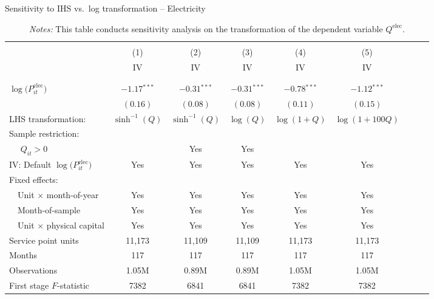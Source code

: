 \begin{table}[t!]\centering
\small
\caption{Sensitivity to IHS vs.\ log transformation -- Electricity  \label{tab:elec_regs_ihs_logs}}
\vspace{-0.1cm}
\small
\begin{adjustbox}{center} 
\begin{tabular}{lcccccccc} 
\hline \hline
\vspace{-0.37cm}
\\
 & (1)  & (2)  & (3)  & (4)  & (5)   \\ 
[0.1em]
 & IV & IV & IV & IV & IV  \\
\vspace{-0.37cm}
\\
\cline{2-6}
\vspace{-0.27cm}
\\
 $\log\big(P^{\text{elec}}_{it}\big)$ ~ & $-1.17$$^{***}$  & $-0.31$$^{***}$ & $-0.31$$^{***}$ & $-0.78$$^{***}$ & $-1.12$$^{***}$ \\ 
& $(0.16)$ & $(0.08)$ & $(0.08)$ & $(0.11)$ & $(0.15)$  \\
[1.5em] 
LHS transformation: & $ \sinh^{-1}(Q) $ & $ \sinh^{-1}(Q) $ & $\log(Q)$  & $\log(1+Q)$   &  $\log(1+100Q)$  \\
[1.5em] 
Sample restriction: \\
~~ $Q_{it} > 0$ &  &Yes &Yes  &   &    \\
[1em] 
IV: Default $\log\big(P^{\text{elec}}_{it}\big)$  & Yes & Yes & Yes  & Yes  &  Yes \\
[1em] 
Fixed effects: \\
[0.1em] 
~~Unit $\times$ month-of-year  & Yes  & Yes  & Yes  & Yes  & Yes   \\ 
[0.1em] 
~~Month-of-sample  & Yes  & Yes  & Yes  & Yes  & Yes     \\ 
[0.1em] 
~~Unit $\times$ physical capital & Yes & Yes & Yes & Yes & Yes  \\
[1em] 
Service point units & 11,173 & 11,109 & 11,109 & 11,173 & 11,173   \\ 
[0.1em] 
Months  & 117 & 117 & 117 & 117 & 117  \\ 
[0.1em] 
Observations & 1.05M & 0.89M & 0.89M & 1.05M & 1.05M  \\ 
[0.1em] 
First stage $F$-statistic & 7382 & 6841 & 6841 & 7382 & 7382  \\ 
[0.15em]
\hline
\end{tabular}
\end{adjustbox}
\captionsetup{width=\textwidth}
\caption*{\scriptsize \emph{Notes:} This table conducts sensitivity analysis on the transformation of the dependent variable $Q^{\text{elec}}$.
}
\end{table}

